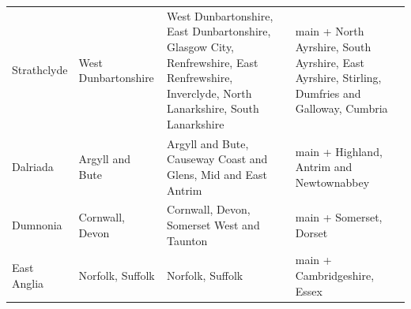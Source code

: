 \documentclass[11pt,a4paper]{article}
\begin{document}
\begin{table}[tbp]
\begin{tabular}{p{1.7cm}p{3.4cm}p{6.2cm}p{3.6cm}}
Strathclyde & West Dunbartonshire & West Dunbartonshire, East Dunbartonshire, Glasgow City, Renfrewshire, East Renfrewshire, Inverclyde, North Lanarkshire, South Lanarkshire & main + North Ayrshire, South Ayrshire, East Ayrshire, Stirling, Dumfries and Galloway, Cumbria\\
Dalriada & Argyll and Bute & Argyll and Bute, Causeway Coast and Glens, Mid and East Antrim & main + Highland, Antrim and Newtownabbey\\
Dumnonia & Cornwall, Devon & Cornwall, Devon, Somerset West and Taunton & main + Somerset, Dorset\\
East Anglia & Norfolk, Suffolk & Norfolk, Suffolk & main + Cambridgeshire, Essex\\
\bottomrule\end{tabular}\end{table}
\end{document}

